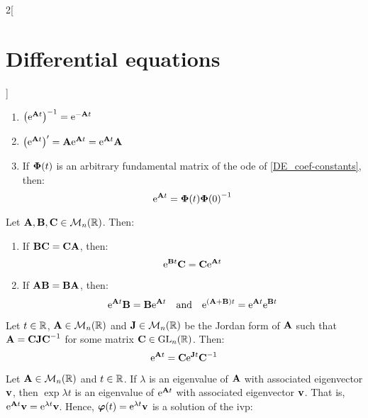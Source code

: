 \documentclass[../../../main.tex]{subfiles}
\begin{document}
\begin{multicols}{2}[\section{Differential equations}]
\begin{prop}
\begin{enumerate}
      \item ${\left(\mathrm{e}^{\boldsymbol{\mathrm{A}}t}\right)}^{-1}=\mathrm{e}^{-\boldsymbol{\mathrm{A}}t}$
      \item $\left(\mathrm{e}^{\boldsymbol{\mathrm{A}}t}\right)'=\boldsymbol{\mathrm{A}}\mathrm{e}^{\boldsymbol{\mathrm{A}}t}=\mathrm{e}^{\boldsymbol{\mathrm{A}}t}\boldsymbol{\mathrm{A}}$
      \item If $\boldsymbol{\mathrm{\Phi}}(t)$ is an arbitrary fundamental matrix of the ode of \cref{DE_coef-constants}, then: $$\mathrm{e}^{\boldsymbol{\mathrm{A}}t}=\boldsymbol{\mathrm{\Phi}}(t){\boldsymbol{\mathrm{\Phi}}(0)}^{-1}$$
    \end{enumerate}
  \end{prop}
  \begin{lemma}
    Let $\boldsymbol{\mathrm{A}},\boldsymbol{\mathrm{B}},\boldsymbol{\mathrm{C}}\in\mathcal{M}_n(\mathbb{R})$. Then:
    \begin{enumerate}
      \item If $\boldsymbol{\mathrm{B}}\boldsymbol{\mathrm{C}}=\boldsymbol{\mathrm{C}}\boldsymbol{\mathrm{A}}$, then: $$\mathrm{e}^{\boldsymbol{\mathrm{B}}t}\boldsymbol{\mathrm{C}}=\boldsymbol{\mathrm{C}}\mathrm{e}^{\boldsymbol{\mathrm{A}}t}$$
      \item If $\boldsymbol{\mathrm{A}}\boldsymbol{\mathrm{B}}=\boldsymbol{\mathrm{B}}\boldsymbol{\mathrm{A}}$, then: $$\mathrm{e}^{\boldsymbol{\mathrm{A}}t}\boldsymbol{\mathrm{B}}=\boldsymbol{\mathrm{B}}\mathrm{e}^{\boldsymbol{\mathrm{A}}t}\quad\text{and}\quad\mathrm{e}^{(\boldsymbol{\mathrm{A}}+\boldsymbol{\mathrm{B}})t}=\mathrm{e}^{\boldsymbol{\mathrm{A}}t}\mathrm{e}^{\boldsymbol{\mathrm{B}}t}$$
    \end{enumerate}
  \end{lemma}
  \begin{corollary}
    Let $t\in\mathbb{R}$, $\boldsymbol{\mathrm{A}}\in\mathcal{M}_n(\mathbb{R})$ and $\boldsymbol{\mathrm{J}}\in\mathcal{M}_n(\mathbb{R})$ be the Jordan form of $\boldsymbol{\mathrm{A}}$ such that $\boldsymbol{\mathrm{A}}=\boldsymbol{\mathrm{C}}\boldsymbol{\mathrm{J}}\boldsymbol{\mathrm{C}}^{-1}$ for some matrix $\boldsymbol{\mathrm{C}}\in\mathrm{GL}_n(\mathbb{R})$. Then: $$\mathrm{e}^{\boldsymbol{\mathrm{A}}t}=\boldsymbol{\mathrm{C}}\mathrm{e}^{\boldsymbol{\mathrm{J}}t}\boldsymbol{\mathrm{C}}^{-1}$$
  \end{corollary}
  \begin{prop}
    Let $\boldsymbol{\mathrm{A}}\in\mathcal{M}_n(\mathbb{R})$ and $t\in\mathbb{R}$. If $\lambda$ is an eigenvalue of $\boldsymbol{\mathrm{A}}$ with associated eigenvector $\boldsymbol{\mathrm{v}}$, then $\exp{\lambda t}$ is an eigenvalue of $\mathrm{e}^{\boldsymbol{\mathrm{A}}t}$ with associated eigenvector $\boldsymbol{\mathrm{v}}$. That is, $\mathrm{e}^{\boldsymbol{\mathrm{A}}t}\boldsymbol{\mathrm{v}}=\mathrm{e}^{\lambda t}\boldsymbol{\mathrm{v}}$. Hence, $\boldsymbol{\mathrm{\varphi}}(t)=\mathrm{e}^{\lambda t}\boldsymbol{\mathrm{v}}$ is a solution of the ivp:

\end{prop}
\end{multicols}
\end{document}

